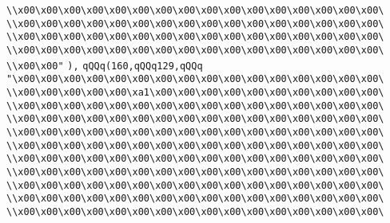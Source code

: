 \verb|\\x00\x00\x00\x00\x00\x00\x00\x00\x00\x00\x00\x00\x00\x00\x00\x00\|\newline
\verb|\\x00\x00\x00\x00\x00\x00\x00\x00\x00\x00\x00\x00\x00\x00\x00\x00\|\newline
\verb|\\x00\x00\x00\x00\x00\x00\x00\x00\x00\x00\x00\x00\x00\x00\x00\x00\|\newline
\verb|\\x00\x00\x00\x00\x00\x00\x00\x00\x00\x00\x00\x00\x00\x00\x00\x00\|\newline
\verb|\\x00\x00"|\newline
\verb|),|\newline
\verb|qQQq(160,qQQq129,qQQq|\newline
\verb|"\x00\x00\x00\x00\x00\x00\x00\x00\x00\x00\x00\x00\x00\x00\x00\x00\|\newline
\verb|\\x00\x00\x00\x00\x00\xa1\x00\x00\x00\x00\x00\x00\x00\x00\x00\x00\|\newline
\verb|\\x00\x00\x00\x00\x00\x00\x00\x00\x00\x00\x00\x00\x00\x00\x00\x00\|\newline
\verb|\\x00\x00\x00\x00\x00\x00\x00\x00\x00\x00\x00\x00\x00\x00\x00\x00\|\newline
\verb|\\x00\x00\x00\x00\x00\x00\x00\x00\x00\x00\x00\x00\x00\x00\x00\x00\|\newline
\verb|\\x00\x00\x00\x00\x00\x00\x00\x00\x00\x00\x00\x00\x00\x00\x00\x00\|\newline
\verb|\\x00\x00\x00\x00\x00\x00\x00\x00\x00\x00\x00\x00\x00\x00\x00\x00\|\newline
\verb|\\x00\x00\x00\x00\x00\x00\x00\x00\x00\x00\x00\x00\x00\x00\x00\x00\|\newline
\verb|\\x00\x00\x00\x00\x00\x00\x00\x00\x00\x00\x00\x00\x00\x00\x00\x00\|\newline
\verb|\\x00\x00\x00\x00\x00\x00\x00\x00\x00\x00\x00\x00\x00\x00\x00\x00\|\newline
\verb|\\x00\x00\x00\x00\x00\x00\x00\x00\x00\x00\x00\x00\x00\x00\x00\x00\|\newline
